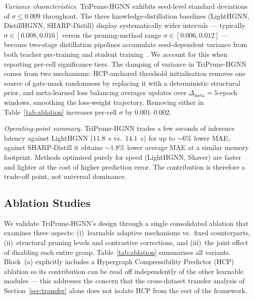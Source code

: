 \documentclass[10pt]{article}
\theoremstyle{plain}
\theoremstyle{definition}
\begin{document}
\emph{Variance characteristics.} TriPrune-HGNN exhibits seed-level standard deviations of $\sigma\!\le\!0.009$ throughout. The three knowledge-distillation baselines (LightHGNN, DistillHGNN, SHARP-Distill) display systematically wider intervals --- typically $\sigma\!\in\![0.008,0.016]$ versus the pruning-method range $\sigma\!\in\![0.006,0.012]$ --- because two-stage distillation pipelines accumulate seed-dependent variance from both teacher pre-training and student training~\citep{hu2023teacher}. We account for this when reporting per-cell significance tiers. The damping of variance in TriPrune-HGNN comes from two mechanisms: HCP-anchored threshold initialisation removes one source of gate-mask randomness by replacing it with a deterministic structural prior, and meta-learned loss balancing averages updates over $\Delta_{\mathrm{meta}}\!=\!5$-epoch windows, smoothing the loss-weight trajectory. Removing either in Table~\ref{tab:ablation} increases per-cell $\sigma$ by $0.001$--$0.002$.

\emph{Operating-point summary.} TriPrune-HGNN trades a few seconds of inference latency against LightHGNN ($11.8$~s vs.\ $14.1$~s) for up to $\sim 6\%$ lower MAE; against SHARP-Distill it obtains $\sim\!1.8\%$ lower average MAE at a similar memory footprint. Methods optimised purely for speed (LightHGNN, Shaver) are faster and lighter at the cost of higher prediction error. The contribution is therefore a trade-off point, not universal dominance.
\subsection{Ablation Studies}
\label{sec:ablation}

We validate TriPrune-HGNN's design through a single consolidated ablation that examines three aspects: (i)~learnable adaptive mechanisms vs.\ fixed counterparts, (ii)~structural pruning levels and contrastive corrections, and (iii)~the joint effect of disabling each entire group. Table~\ref{tab:ablation} summarises all variants. Block~(a) explicitly includes a Hypergraph Compressibility Predictor (HCP) ablation so its contribution can be read off independently of the other learnable modules --- this addresses the concern that the cross-dataset transfer analysis of Section~\ref{sec:transfer} alone does not isolate HCP from the rest of the framework.
\end{document}
